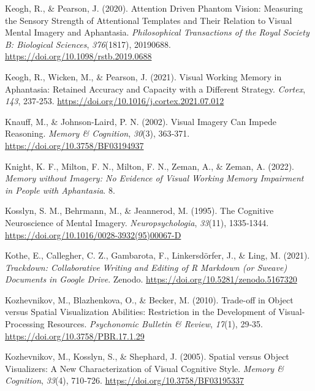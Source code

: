 \documentclass[
  12pt,
]{article}
\newlength{\cslhangindent}
\newlength{\cslentryspacingunit} %
\newenvironment{CSLReferences}[2] %
 {%
  \setlength{\parindent}{0pt}
  \ifodd #1
  \let\oldpar\par
  \def\par{\hangindent=\cslhangindent\oldpar}
  \fi
  \setlength{\parskip}{#2\cslentryspacingunit}
 }%
 {}
\begin{document}
\begin{CSLReferences}{1}{0}
\leavevmode{}%
Keogh, R., \& Pearson, J. (2020). Attention Driven Phantom Vision:
Measuring the Sensory Strength of Attentional Templates and Their
Relation to Visual Mental Imagery and Aphantasia. \emph{Philosophical
Transactions of the Royal Society B: Biological Sciences},
\emph{376}(1817), 20190688. \url{https://doi.org/10.1098/rstb.2019.0688}

\leavevmode{}%
Keogh, R., Wicken, M., \& Pearson, J. (2021). Visual Working Memory in
Aphantasia: {Retained} Accuracy and Capacity with a Different Strategy.
\emph{Cortex}, \emph{143}, 237‑253.
\url{https://doi.org/10.1016/j.cortex.2021.07.012}

\leavevmode{}%
Knauff, M., \& Johnson-Laird, P. N. (2002). Visual Imagery Can Impede
Reasoning. \emph{Memory \& Cognition}, \emph{30}(3), 363‑371.
\url{https://doi.org/10.3758/BF03194937}

\leavevmode{}%
Knight, K. F., Milton, F. N., Milton, F. N., Zeman, A., \& Zeman, A.
(2022). \emph{Memory without {Imagery}: {No Evidence} of {Visual Working
Memory Impairment} in {People} with {Aphantasia}}. 8.

\leavevmode{}%
Kosslyn, S. M., Behrmann, M., \& Jeannerod, M. (1995). The Cognitive
Neuroscience of Mental Imagery. \emph{Neuropsychologia}, \emph{33}(11),
1335‑1344. \url{https://doi.org/10.1016/0028-3932(95)00067-D}

\leavevmode{}%
Kothe, E., Callegher, C. Z., Gambarota, F., Linkersdörfer, J., \& Ling,
M. (2021). \emph{Trackdown: {Collaborative Writing} and {Editing} of {R
Markdown} (or {Sweave}) {Documents} in {Google Drive}}. {Zenodo}.
\url{https://doi.org/10.5281/zenodo.5167320}

\leavevmode{}%
Kozhevnikov, M., Blazhenkova, O., \& Becker, M. (2010). Trade-off in
Object versus Spatial Visualization Abilities: {Restriction} in the
Development of Visual-Processing Resources. \emph{Psychonomic Bulletin
\& Review}, \emph{17}(1), 29‑35.
\url{https://doi.org/10.3758/PBR.17.1.29}

\leavevmode{}%
Kozhevnikov, M., Kosslyn, S., \& Shephard, J. (2005). Spatial versus
Object Visualizers: {A} New Characterization of Visual Cognitive Style.
\emph{Memory \& Cognition}, \emph{33}(4), 710‑726.
\url{https://doi.org/10.3758/BF03195337}


\end{CSLReferences}
\end{document}
